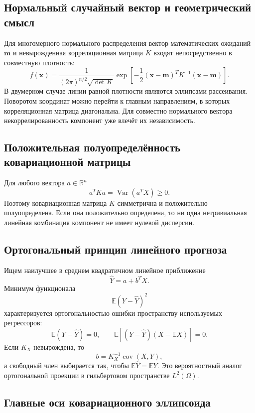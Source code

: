 \subsection{Нормальный случайный вектор и геометрический смысл}

Для многомерного нормального распределения вектор математических ожиданий
$\mathbf m$ и невырожденная корреляционная матрица $K$ входят непосредственно
в совместную плотность:
\[
    f(\mathbf x)=
    \frac{1}{(2\pi)^{n/2}\sqrt{\det K}}
    \exp\!\left[-\frac12
    (\mathbf x-\mathbf m)^T K^{-1}(\mathbf x-\mathbf m)\right].
\]
В двумерном случае линии равной плотности являются эллипсами рассеивания.
Поворотом координат можно перейти к главным направлениям, в которых
корреляционная матрица диагональна. Для совместно нормального вектора
некоррелированность компонент уже влечёт их независимость.


\subsection{Положительная полуопределённость ковариационной матрицы}

Для любого вектора $a\in\mathbb R^n$
\[
    a^TKa
    =\operatorname{Var}(a^TX)\ge0.
\]
Поэтому ковариационная матрица $K$ симметрична и положительно полуопределена. Если
она положительно определена, то ни одна нетривиальная линейная комбинация компонент
не имеет нулевой дисперсии.

\subsection{Ортогональный принцип линейного прогноза}

Ищем наилучшее в среднем квадратичном линейное приближение
\[
    \widehat Y=a+b^TX.
\]
Минимум функционала
\[
    \mathbb E(Y-\widehat Y)^2
\]
характеризуется ортогональностью ошибки пространству используемых регрессоров:
\[
    \mathbb E(Y-\widehat Y)=0,
\qquad
    \mathbb E[(Y-\widehat Y)(X-\mathbb EX)]=0.
\]
Если $K_X$ невырождена, то
\[
    b=K_X^{-1}\operatorname{cov}(X,Y),
\]
а свободный член выбирается так, чтобы $\mathbb E\widehat Y=\mathbb EY$.
Это вероятностный аналог ортогональной проекции в гильбертовом пространстве
$L^2(\Omega)$.

\subsection{Главные оси ковариационного эллипсоида}

